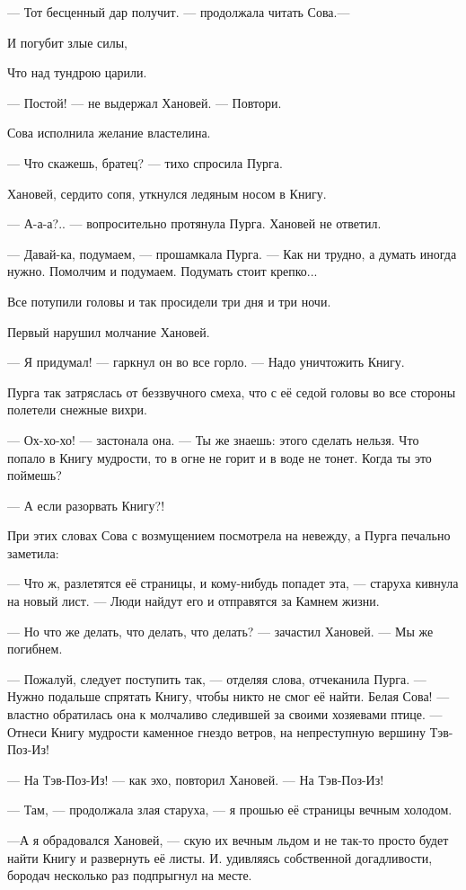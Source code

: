 \documentclass[oneside,final,14pt]{extreport}
\begin{document}
	— Тот бесценный дар получит. — продолжала читать Сова.—
	
	И погубит злые силы,
	
	Что над тундрою царили.
	
	— Постой! — не выдержал Хановей. — Повтори.
	
	Сова исполнила желание властелина.
	
	— Что скажешь, братец? — тихо спросила Пурга.
	
	Хановей, сердито сопя, уткнулся ледяным носом в Книгу.
	
	— А-а-а?.. — вопросительно протянула Пурга. Хановей не ответил.
	
	— Давай-ка, подумаем, — прошамкала Пурга. — Как ни трудно, а думать иногда нужно. Помолчим и подумаем. Подумать стоит крепко...
	
	Все потупили головы и так просидели три дня и три ночи.
	
	Первый нарушил молчание Хановей.
	
	— Я придумал! — гаркнул он во все горло. — Надо уничтожить Книгу.
	
	Пурга так затряслась от беззвучного смеха, что с её седой головы во все стороны полетели снежные вихри.
	
	— Ох-хо-хо! — застонала она. — Ты же знаешь: этого сделать нельзя. Что попало в Книгу мудрости, то в огне не горит и в воде не тонет. Когда ты это поймешь?
	
	— А если разорвать Книгу?!
	
	При этих словах Сова с возмущением посмотрела на невежду, а Пурга печально заметила:
	
	— Что ж, разлетятся её страницы, и кому-нибудь попадет эта, — старуха кивнула на новый лист. — Люди найдут его и отправятся за Камнем жизни.
	
	— Но что же делать, что делать, что делать? — зачастил Хановей. — Мы же погибнем.
	
	— Пожалуй, следует поступить так, — отделяя слова, отчеканила Пурга. — Нужно подальше спрятать Книгу, чтобы никто не смог её найти. Белая Сова! — властно обратилась она к молчаливо следившей за своими хозяевами птице. — Отнеси Книгу мудрости каменное гнездо ветров, на непреступную вершину Тэв-Поз-Из!
	
	— На Тэв-Поз-Из! — как эхо, повторил Хановей. — На Тэв-Поз-Из!
	
	— Там, — продолжала злая старуха, — я прошью её страницы вечным холодом.
	
	—А я обрадовался Хановей, — скую их вечным льдом и не так-то просто будет найти Книгу и развернуть её листы. И. удивляясь собственной догадливости, бородач несколько раз подпрыгнул на месте.
	
\end{document}
